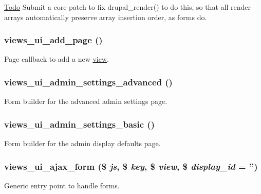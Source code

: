 \begin{Desc}
\item[\hyperlink{todo__todo000050}{Todo}]Submit a core patch to fix drupal\_\-render() to do this, so that all render arrays automatically preserve array insertion order, as forms do. \end{Desc}
\hypertarget{admin_8inc_af5b029abb01c601d29c40a83733a725d}{
\subsubsection[{views\_\-ui\_\-add\_\-page}]{\setlength{\rightskip}{0pt plus 5cm}views\_\-ui\_\-add\_\-page ()}}
\label{admin_8inc_af5b029abb01c601d29c40a83733a725d}
Page callback to add a new \hyperlink{classview}{view}. \hypertarget{admin_8inc_acba3ba9c4723a90c445a86b42e32b178}{
\subsubsection[{views\_\-ui\_\-admin\_\-settings\_\-advanced}]{\setlength{\rightskip}{0pt plus 5cm}views\_\-ui\_\-admin\_\-settings\_\-advanced ()}}
\label{admin_8inc_acba3ba9c4723a90c445a86b42e32b178}
Form builder for the advanced admin settings page. \hypertarget{admin_8inc_a4657997fea8295005c67fe12a3e89e6b}{
\subsubsection[{views\_\-ui\_\-admin\_\-settings\_\-basic}]{\setlength{\rightskip}{0pt plus 5cm}views\_\-ui\_\-admin\_\-settings\_\-basic ()}}
\label{admin_8inc_a4657997fea8295005c67fe12a3e89e6b}
Form builder for the admin display defaults page. \hypertarget{admin_8inc_a9469fe3e11f533b7cd255191f4b1ac7e}{
\subsubsection[{views\_\-ui\_\-ajax\_\-form}]{\setlength{\rightskip}{0pt plus 5cm}views\_\-ui\_\-ajax\_\-form (\$ {\em js}, \/  \$ {\em key}, \/  \$ {\em view}, \/  \$ {\em display\_\-id} = {\ttfamily ''})}}
\label{admin_8inc_a9469fe3e11f533b7cd255191f4b1ac7e}
Generic entry point to handle forms.


